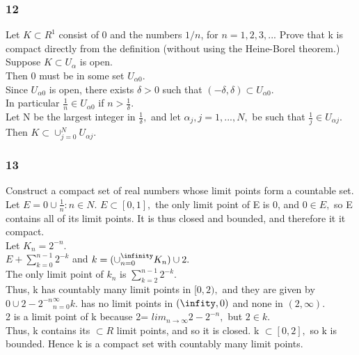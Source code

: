 \subsubsection*{12}
Let $K \subset R^1$ consist of 0 and the numbers $1/n$, for $n=1,2,3,...$ Prove that k is compact directly from the definition (without using the Heine-Borel theorem.)\\ 
Suppose $K \subset U_{\alpha}$ is open. \\ 
Then 0 must be in some set $U_{\alpha 0}.$\\ 
Since $U_{\alpha 0}$ is open, there exists $\delta >0$ such that $(- \delta , \delta) \subset U_{\alpha 0}.$\\ 
In particular $\frac{1}{n} \in U_{\alpha 0}$ if $n> \frac{1}{\delta}.$ \\ 
Let N be the largest integer in $\frac{1}{\delta},$ and let $\alpha_j, j=1,...,N,$ be such that $\frac{1}{j} \in U_{\alpha j}.$\\ 
Then $K \subset \cup_{j=0}^N U_{\alpha j}.$
\subsubsection*{13}
Construct a compact set of real numbers whose limit points form a countable set. \\ 
Let $E={0} \cup {\frac{1}{n}: n \in N}.$ $E \subset [0,1],$ the only limit point of E is 0, and $0 \in E,$ so E contains all of its limit points. It is thus closed and bounded, and therefore it it compact. \\ 
Let $K_{n}=2^{-n}.$ \\ 
$E +\sum_{k=0}^{n-1} 2^{-k}$ and $k=(\cup_{n=0}^\infinity K_n)\cup {2}.$\\ 
The only limit point of $k_n$ is $\sum_{k=2}^{n-1}2^{-k}.$\\ 
Thus, k has countably many limit points in $[0,2),$ and they are given by ${0} \cup {2-2^{-n}}_{n=0}^{\infty} k.$ has no limit points in $(\-\infity,0)$ and none in $(2, \infty)$.\\ 
2 is a limit point of k because 2= $lim_{n \longrightarrow \infty} 2-2^{-n},$ but $2 \in k. $\\ 
Thus, k contains its $\subset R$ limit points, and so it is closed. k $\subset [0,2],$ so k is bounded. Hence k is a compact set with countably many limit points.
